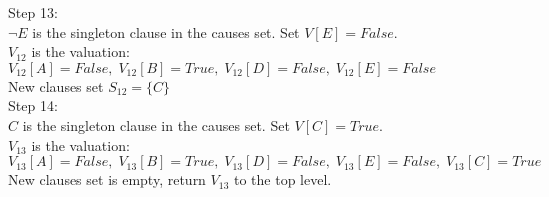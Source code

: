 \documentclass{article}
\begin{document}
\begin{description}
Step 13:\\
$ \neg E $ is the singleton clause in the causes set. Set $V[E]=False$.\\
$V_{12}$ is the valuation: $ V_{12}[A]=False,\; V_{12}[B]=True,\; V_{12}[D]=False,\; V_{12}[E]=False $\\
New clauses set $ S_{12}=\{C\} $\\

Step 14:\\
$ C $ is the singleton clause in the causes set. Set $V[C]=True$.\\
$V_{13}$ is the valuation: $ V_{13}[A]=False,\; V_{13}[B]=True,\; V_{13}[D]=False,\; V_{13}[E]=False,\; V_{13}[C]=True $\\
New clauses set is empty, return $V_{13}$ to the top level.

\end{description}
\end{document}
